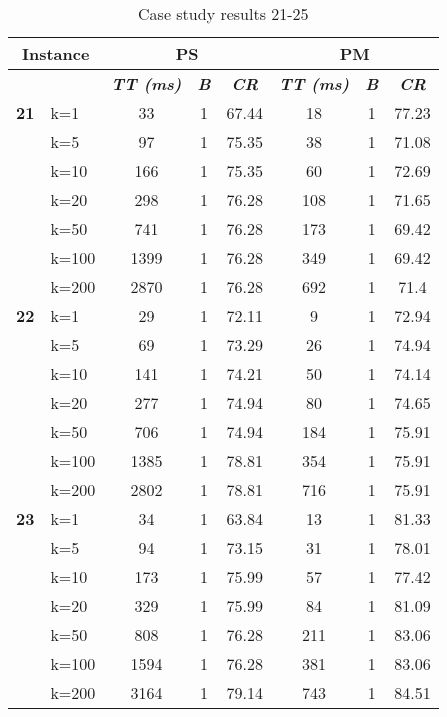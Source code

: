     \begin{table}[htbp]
    \caption{Case study results 21-25}
    \centering
    \begin{tabular}{|l|l|c|c|c|c|c|c|}
    \hline
    \multicolumn{ 2}{|c|}{\textbf{Instance}} & \multicolumn{ 3}{c|}{\textbf{PS}} & \multicolumn{ 3}{c|}{\textbf{PM}} \\ \hline
    \multicolumn{ 2}{|l|}{} & \textbf{\textit{TT (ms)}} & \textbf{\textit{B}} & \textbf{\textit{CR}} & \textbf{\textit{TT (ms)}} & \textbf{\textit{B}} & \textbf{\textit{CR}} \\ \hline
    \multicolumn{1}{|r|}{\textbf{21}} & k=1 & 33 & 1 & 67.44 & 18 & 1 & 77.23 \\ 
     & k=5 & 97 & 1 & 75.35 & 38 & 1 & 71.08 \\ 
     & k=10 & 166 & 1 & 75.35 & 60 & 1 & 72.69 \\ 
     & k=20 & 298 & 1 & 76.28 & 108 & 1 & 71.65 \\ 
     & k=50 & 741 & 1 & 76.28 & 173 & 1 & 69.42 \\ 
     & k=100 & 1399 & 1 & 76.28 & 349 & 1 & 69.42 \\ 
     & k=200 & 2870 & 1 & 76.28 & 692 & 1 & 71.4 \\ \hline
    \multicolumn{1}{|r|}{\textbf{22}} & k=1 & 29 & 1 & 72.11 & 9 & 1 & 72.94 \\ 
     & k=5 & 69 & 1 & 73.29 & 26 & 1 & 74.94 \\ 
     & k=10 & 141 & 1 & 74.21 & 50 & 1 & 74.14 \\ 
     & k=20 & 277 & 1 & 74.94 & 80 & 1 & 74.65 \\ 
     & k=50 & 706 & 1 & 74.94 & 184 & 1 & 75.91 \\ 
     & k=100 & 1385 & 1 & 78.81 & 354 & 1 & 75.91 \\ 
     & k=200 & 2802 & 1 & 78.81 & 716 & 1 & 75.91 \\ \hline
    \multicolumn{1}{|r|}{\textbf{23}} & k=1 & 34 & 1 & 63.84 & 13 & 1 & 81.33 \\ 
     & k=5 & 94 & 1 & 73.15 & 31 & 1 & 78.01 \\ 
     & k=10 & 173 & 1 & 75.99 & 57 & 1 & 77.42 \\ 
     & k=20 & 329 & 1 & 75.99 & 84 & 1 & 81.09 \\ 
     & k=50 & 808 & 1 & 76.28 & 211 & 1 & 83.06 \\ 
     & k=100 & 1594 & 1 & 76.28 & 381 & 1 & 83.06 \\ 
     & k=200 & 3164 & 1 & 79.14 & 743 & 1 & 84.51 \\ \hline

\end{tabular}
\end{table}
